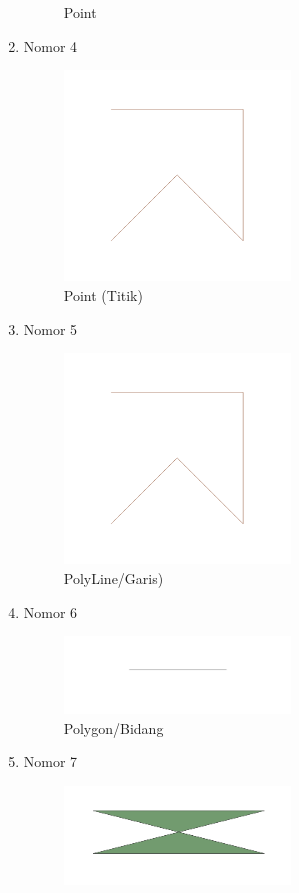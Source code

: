 \begin{enumerate}
\begin{figure}[H]
		\centering
		\caption{Point}
	\end{figure}
	\item Nomor 4
	
	\begin{figure}[H]
		\includegraphics[width=6cm]{figures/Tugas2/1174062/Soal4.png}
		\centering
		\caption{Point (Titik)}
	\end{figure}
	\item Nomor 5
	
	\begin{figure}[H]
		\includegraphics[width=6cm]{figures/Tugas2/1174062/Soal5.png}
		\centering
		\caption{PolyLine/Garis)}
	\end{figure}
	\item Nomor 6
	
	\begin{figure}[H]
		\includegraphics[width=6cm]{figures/Tugas2/1174062/Soal6.png}
		\centering
		\caption{Polygon/Bidang}
	\end{figure}
	\item Nomor 7
	
	\begin{figure}[H]
		\includegraphics[width=6cm]{figures/Tugas2/1174062/Soal7.png}

\end{figure}
\end{enumerate}
